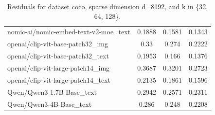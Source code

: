 \begin{table}[ht]
\begin{tabular}{lccc}
nomic-ai/nomic-embed-text-v2-moe\_text & 0.1888 & 0.1581 & 0.1343 \\
openai/clip-vit-base-patch32\_img & 0.33 & 0.274 & 0.2222 \\
openai/clip-vit-base-patch32\_text & 0.1953 & 0.166 & 0.1376 \\
openai/clip-vit-large-patch14\_img & 0.3687 & 0.3201 & 0.2723 \\
openai/clip-vit-large-patch14\_text & 0.2135 & 0.1861 & 0.1596 \\
Qwen/Qwen3-1.7B-Base\_text & 0.2942 & 0.2571 & 0.2311 \\
Qwen/Qwen3-4B-Base\_text & 0.286 & 0.248 & 0.2208 \\
\hline
\end{tabular}
\caption{Residuals for dataset coco, sparse dimension d=8192, and k in \{32, 64, 128\}.}
\label{tab:residuals_coco_d_8192}
\end{table}
